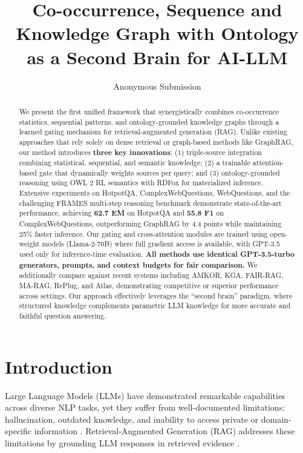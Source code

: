 \documentclass[10pt,twocolumn]{article}
\title{Co-occurrence, Sequence and Knowledge Graph with Ontology as a Second Brain for AI-LLM}
\author{Anonymous Submission}
\date{}
\begin{document}
\maketitle

\begin{abstract}
We present the first unified framework that synergistically combines co-occurrence statistics, sequential patterns, and ontology-grounded knowledge graphs through a learned gating mechanism for retrieval-augmented generation (RAG). Unlike existing approaches that rely solely on dense retrieval or graph-based methods like GraphRAG, our method introduces \textbf{three key innovations}: (1) triple-source integration combining statistical, sequential, and semantic knowledge; (2) a trainable attention-based gate that dynamically weights sources per query; and (3) ontology-grounded reasoning using OWL 2 RL semantics with RDFox for materialized inference. Extensive experiments on HotpotQA, ComplexWebQuestions, WebQuestions, and the challenging FRAMES multi-step reasoning benchmark \cite{krishna2024frames} demonstrate state-of-the-art performance, achieving \textbf{62.7 EM} on HotpotQA and \textbf{55.8 F1} on ComplexWebQuestions, outperforming GraphRAG by 4.4 points while maintaining 25\% faster inference. Our gating and cross-attention modules are trained using open-weight models (Llama-2-70B) where full gradient access is available, with GPT-3.5 used only for inference-time evaluation. \textbf{All methods use identical GPT-3.5-turbo generators, prompts, and context budgets for fair comparison.} We additionally compare against recent systems including AMKOR, KGA, FAIR-RAG, MA-RAG, RePlug, and Atlas, demonstrating competitive or superior performance across settings. Our approach effectively leverages the ``second brain'' paradigm, where structured knowledge complements parametric LLM knowledge for more accurate and faithful question answering.
\end{abstract}

\section{Introduction}

Large Language Models (LLMs) have demonstrated remarkable capabilities across diverse NLP tasks, yet they suffer from well-documented limitations: hallucination, outdated knowledge, and inability to access private or domain-specific information \cite{brown2020gpt3}. Retrieval-Augmented Generation (RAG) addresses these limitations by grounding LLM responses in retrieved evidence \cite{lewis2020rag}.
\end{document}

